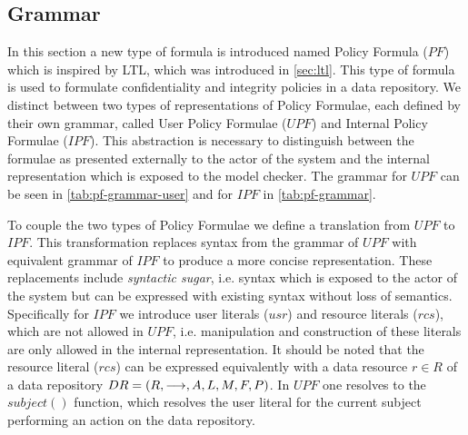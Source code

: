 \subsection{Grammar}\label{sec:grammar}
In this section a new type of formula is introduced named Policy Formula ($PF$) which is inspired by LTL, which was introduced in \autoref{sec:ltl}. This type of formula is used to formulate confidentiality and integrity policies in a data repository. We distinct between two types of representations of Policy Formulae, each defined by their own grammar, called User Policy Formulae ($UPF$) and Internal Policy Formulae ($IPF$). This abstraction is necessary to distinguish between the formulae as presented externally to the actor of the system and the internal representation which is exposed to the model checker. The grammar for $UPF$ can be seen in \autoref{tab:pf-grammar-user} and for $IPF$ in \autoref{tab:pf-grammar}.





To couple the two types of Policy Formulae we define a translation from $UPF$ to $IPF$. This transformation replaces syntax from the grammar of $UPF$ with equivalent grammar of $IPF$ to produce a more concise representation. These replacements include \emph{syntactic sugar}, i.e. syntax which is exposed to the actor of the system but can be expressed with existing syntax without loss of semantics. Specifically for $IPF$ we introduce user literals ($usr$) and resource literals ($rcs$), which are not allowed in $UPF$, i.e. manipulation and construction of these literals are only allowed in the internal representation. It should be noted that the resource literal ($rcs$) can be expressed equivalently with a data resource $r \in R$ of a data repository $DR= \left( R, \longrightarrow, A, L, M, F, P \right)$. In $UPF$ one resolves to the $subject()$ function, which resolves the user literal for the current subject performing an action on the data repository.

